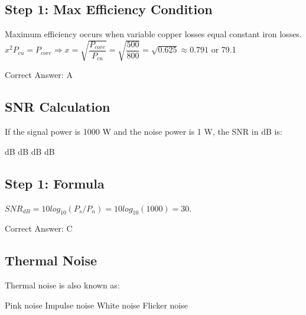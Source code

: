 \begin{choices}
\end{choices}

\begin{solution}

\subsection*{Step 1: Max Efficiency Condition}
Maximum efficiency occurs when variable copper losses equal constant iron losses. $x^2 P_{cu} = P_{core} \Rightarrow x = \sqrt{\dfrac{P_{core}}{P_{cu}}} = \sqrt{\dfrac{500}{800}} = \sqrt{0.625} \approx 0.791$ or 79.1%

Correct Answer: A
\end{solution}

\clearpage

\subsection{SNR Calculation}

If the signal power is 1000 W and the noise power is 1 W, the SNR in dB is:

\begin{choices}
     dB
     dB
     dB
     dB
\end{choices}

\begin{solution}

\subsection*{Step 1: Formula}
$SNR_{dB} = 10 log_{10}(P_s / P_n) = 10 log_{10}(1000) = 30$.

Correct Answer: C
\end{solution}

\clearpage

\subsection{Thermal Noise}

Thermal noise is also known as:

\begin{choices}
    \choice Pink noise
    \choice Impulse noise
    \correctchoice White noise
    \choice Flicker noise
\end{choices}

